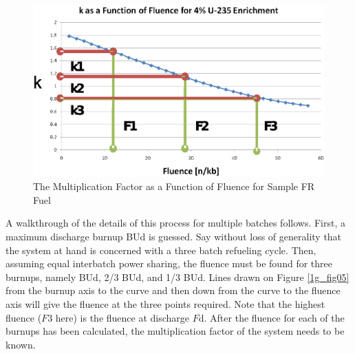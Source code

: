 \begin{figure}[htbp]
\caption{The Multiplication Factor as a Function of Fluence for Sample FR Fuel}
\label{1g_fig06}
\begin{center}
\includegraphics[scale=0.5]{one_group_method/figs/Fig06.eps}
\end{center}
\end{figure}

A walkthrough of the details of this process for multiple batches follows.  First, a maximum 
discharge burnup BUd is guessed.  Say without loss of generality that the system at hand is 
concerned with a three batch refueling cycle.  Then, assuming equal interbatch power sharing, 
the fluence must be found for three burnups, namely BUd, 2/3 BUd, and 1/3 BUd.   Lines drawn on 
Figure \ref{1g_fig05} from the burnup axis to the curve and then down from the curve to the fluence 
axis will give the fluence at the three points required.  Note that the highest fluence ($F3$ here) 
is the fluence at discharge $F\mbox{d}$.  After the fluence for each of the burnups has been calculated, 
the multiplication factor of the system needs to be known. 

